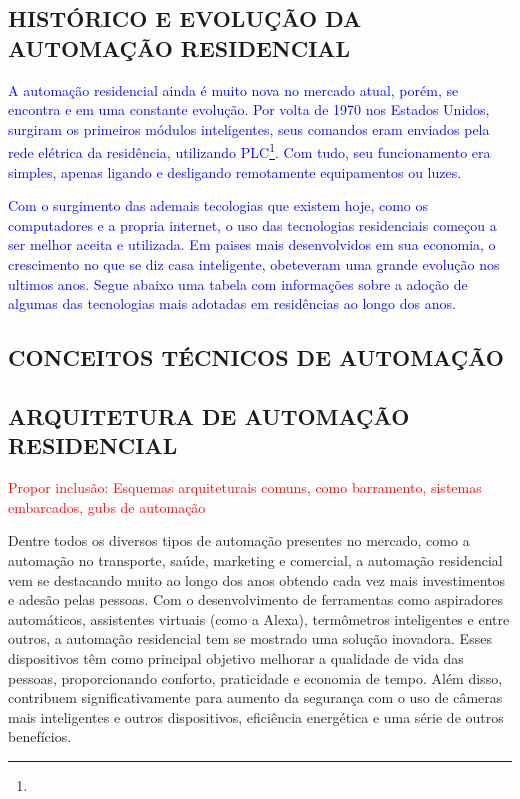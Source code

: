     

    \subsection{HISTÓRICO E EVOLUÇÃO DA AUTOMAÇÃO RESIDENCIAL}
        \textcolor{blue}{A automação residencial ainda é muito nova no mercado atual, porém, se encontra e em uma constante evolução. Por volta de 1970 nos Estados Unidos, surgiram os primeiros módulos inteligentes, seus comandos eram enviados pela rede elétrica da residência, utilizando PLC\footnote{}. Com tudo, seu funcionamento era simples, apenas ligando e desligando remotamente equipamentos ou luzes.}

        \textcolor{blue}{Com o surgimento das ademais tecologias que existem hoje, como os computadores e a propria internet, o uso das tecnologias residenciais começou a ser melhor aceita e utilizada. Em paises mais desenvolvidos em sua economia, o crescimento no que se diz casa inteligente, obeteveram uma grande evolução nos ultimos anos. Segue abaixo uma tabela com informações sobre a adoção de algumas das tecnologias mais adotadas em residências ao longo dos anos.}

        


    \subsection{CONCEITOS TÉCNICOS DE AUTOMAÇÃO}


    \subsection{ARQUITETURA DE AUTOMAÇÃO RESIDENCIAL}

        \textcolor{red}{Propor inclusão: Esquemas arquiteturais comuns, como barramento, sistemas embarcados, gubs de automação}
    
        Dentre todos os diversos tipos de automação presentes no mercado, como a automação no transporte, saúde, marketing e comercial, a automação residencial vem se destacando muito ao longo dos anos obtendo cada vez mais investimentos e adesão pelas pessoas. Com o desenvolvimento de ferramentas como aspiradores automáticos, assistentes virtuais (como a Alexa), termômetros inteligentes e entre outros, a automação residencial tem se mostrado uma solução inovadora. Esses dispositivos têm como principal objetivo melhorar a qualidade de vida das pessoas, proporcionando conforto, praticidade e economia de tempo. Além disso, contribuem significativamente para aumento da segurança com o uso de câmeras mais inteligentes e outros dispositivos, eficiência energética e uma série de outros benefícios\cite{automacaoResidencial}.

